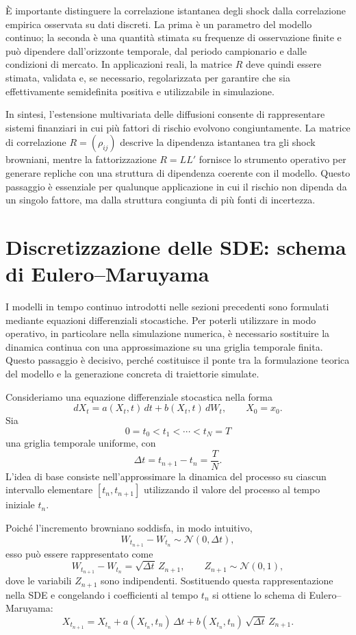 \`{E} importante distinguere la correlazione istantanea degli shock dalla
correlazione empirica osservata su dati discreti. La prima \`{e} un
parametro del modello continuo; la seconda \`{e} una quantit\`{a} stimata
su frequenze di osservazione finite e pu\`{o} dipendere dall'orizzonte
temporale, dal periodo campionario e dalle condizioni di mercato. In
applicazioni reali, la matrice $R$ deve quindi essere stimata, validata
e, se necessario, regolarizzata per garantire che sia effettivamente
semidefinita positiva e utilizzabile in simulazione.

In sintesi, l'estensione multivariata delle diffusioni consente di
rappresentare sistemi finanziari in cui pi\`{u} fattori di rischio
evolvono congiuntamente. La matrice di correlazione $R=(\rho_{ij})$
descrive la dipendenza istantanea tra gli shock browniani, mentre la
fattorizzazione $R=LL'$ fornisce lo strumento operativo per generare
repliche con una struttura di dipendenza coerente con il modello. Questo passaggio \`{e} essenziale per
qualunque applicazione in cui il rischio non dipenda da un singolo
fattore, ma dalla struttura congiunta di pi\`{u} fonti di incertezza.

\section{Discretizzazione delle SDE: schema di Eulero--Maruyama}

I modelli in tempo continuo introdotti nelle sezioni precedenti sono
formulati mediante equazioni differenziali stocastiche. Per poterli
utilizzare in modo operativo, in particolare nella simulazione numerica,
\`{e} necessario sostituire la dinamica continua con una approssimazione
su una griglia temporale finita. Questo passaggio \`{e} decisivo, perch\'{e}
costituisce il ponte tra la formulazione teorica del modello e la
generazione concreta di traiettorie simulate.

Consideriamo una equazione differenziale stocastica nella forma
\[
dX_t=a(X_t,t)\,dt+b(X_t,t)\,dW_t,
\qquad
X_0=x_0.
\]
Sia
\[
0=t_0<t_1<\cdots<t_N=T
\]
una griglia temporale uniforme, con
\[
\Delta t = t_{n+1}-t_n=\frac{T}{N}.
\]
L'idea di base consiste nell'approssimare la dinamica del processo su
ciascun intervallo elementare $[t_n,t_{n+1}]$ utilizzando il valore del
processo al tempo iniziale $t_n$.

Poich\'{e} l'incremento browniano soddisfa, in modo intuitivo,
\[
W_{t_{n+1}}-W_{t_n}
\sim
\mathcal{N}(0,\Delta t),
\]
esso pu\`{o} essere rappresentato come
\[
W_{t_{n+1}}-W_{t_n}
=
\sqrt{\Delta t}\,Z_{n+1},
\qquad
Z_{n+1}\sim\mathcal{N}(0,1),
\]
dove le variabili $Z_{n+1}$ sono indipendenti. Sostituendo questa
rappresentazione nella SDE e congelando i coefficienti al tempo $t_n$ si
ottiene lo schema di Eulero--Maruyama:
\[
X_{t_{n+1}}
=
X_{t_n}
+
a(X_{t_n},t_n)\,\Delta t
+
b(X_{t_n},t_n)\,\sqrt{\Delta t}\,Z_{n+1}.
\]

